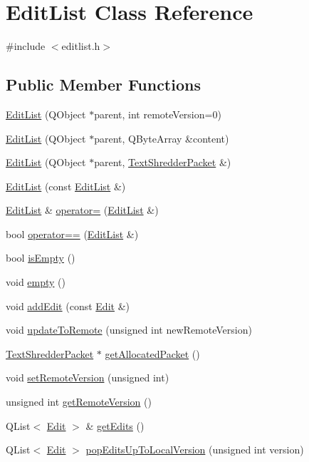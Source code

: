 \hypertarget{class_edit_list}{
\section{EditList Class Reference}
\label{class_edit_list}
}


{\ttfamily \#include $<$editlist.h$>$}

\subsection*{Public Member Functions}
\begin{DoxyCompactItemize}
\item 
\hyperlink{class_edit_list_af5a5ad85bc3dc6bf7d7d94b8972dc0b6}{EditList} (QObject $\ast$parent, int remoteVersion=0)
\item 
\hyperlink{class_edit_list_ae6490c68d1d4a99f11afd1c93d2eca47}{EditList} (QObject $\ast$parent, QByteArray \&content)
\item 
\hyperlink{class_edit_list_a2129725c156538af8c5912ce6c626989}{EditList} (QObject $\ast$parent, \hyperlink{class_text_shredder_packet}{TextShredderPacket} \&)
\item 
\hyperlink{class_edit_list_a7f73f8142ba50f5b0fd13fc7e3394fc6}{EditList} (const \hyperlink{class_edit_list}{EditList} \&)
\item 
\hyperlink{class_edit_list}{EditList} \& \hyperlink{class_edit_list_a7dd9e0691bcf825162566fd3cac2d0a4}{operator=} (\hyperlink{class_edit_list}{EditList} \&)
\item 
bool \hyperlink{class_edit_list_a87b54d8fba61e771b8fe13e7125d708c}{operator==} (\hyperlink{class_edit_list}{EditList} \&)
\item 
bool \hyperlink{class_edit_list_a78ba00570b93a8fa794ab9c681a0dd81}{isEmpty} ()
\item 
void \hyperlink{class_edit_list_ac0fb07cc115af078014d3643f821f835}{empty} ()
\item 
void \hyperlink{class_edit_list_af1e561962340b1b24023052415ef8f94}{addEdit} (const \hyperlink{class_edit}{Edit} \&)
\item 
void \hyperlink{class_edit_list_a8e7b3099b3ce693e01b1321b723ec65f}{updateToRemote} (unsigned int newRemoteVersion)
\item 
\hyperlink{class_text_shredder_packet}{TextShredderPacket} $\ast$ \hyperlink{class_edit_list_ace8dff1c04b64ed883808949b3b5c650}{getAllocatedPacket} ()
\item 
void \hyperlink{class_edit_list_a425671ff64a7e6bee3231ed8a62e87aa}{setRemoteVersion} (unsigned int)
\item 
unsigned int \hyperlink{class_edit_list_a00c2180e295bcb80830f782c04d3e0ee}{getRemoteVersion} ()
\item 
QList$<$ \hyperlink{class_edit}{Edit} $>$ \& \hyperlink{class_edit_list_a4527628441bec5a178f04dd9c5b1a433}{getEdits} ()
\item 
QList$<$ \hyperlink{class_edit}{Edit} $>$ \hyperlink{class_edit_list_ae67563b61f7b2e36d62636b2979232b3}{popEditsUpToLocalVersion} (unsigned int version)
\end{DoxyCompactItemize}


